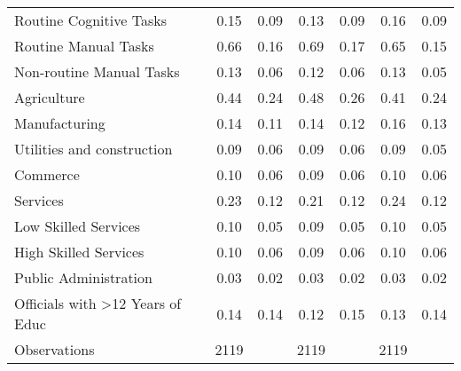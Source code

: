 {\begin{tabular}{l*{3}{cc}}
Routine Cognitive Tasks&        0.15&        0.09&        0.13&        0.09&        0.16&        0.09\\
Routine Manual Tasks&        0.66&        0.16&        0.69&        0.17&        0.65&        0.15\\
Non-routine Manual Tasks&        0.13&        0.06&        0.12&        0.06&        0.13&        0.05\\
Agriculture         &        0.44&        0.24&        0.48&        0.26&        0.41&        0.24\\
Manufacturing       &        0.14&        0.11&        0.14&        0.12&        0.16&        0.13\\
Utilities and construction&        0.09&        0.06&        0.09&        0.06&        0.09&        0.05\\
Commerce            &        0.10&        0.06&        0.09&        0.06&        0.10&        0.06\\
Services            &        0.23&        0.12&        0.21&        0.12&        0.24&        0.12\\
Low Skilled Services&        0.10&        0.05&        0.09&        0.05&        0.10&        0.05\\
High Skilled Services&        0.10&        0.06&        0.09&        0.06&        0.10&        0.06\\
Public Administration&        0.03&        0.02&        0.03&        0.02&        0.03&        0.02\\
Officials with >12 Years of Educ&        0.14&        0.14&        0.12&        0.15&        0.13&        0.14\\
\hline
Observations        &        2119&            &        2119&            &        2119&            \\
\hline\hline
\end{tabular}
}
